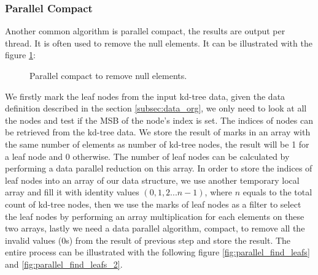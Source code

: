 \subsubsection{Parallel Compact} 
Another common algorithm is parallel compact, the results are output per thread. It is often used to remove the null elements. It can be illustrated with the figure \ref{fig:parallel_compact}: 

\begin{figure}
    \centering
    \renewcommand{\thefigure}{\thechapter.\arabic{figure}}
    \caption[Parallel Compact]{Parallel compact to remove null elements. }
    \label{fig:parallel_compact}
\end{figure} 

We firstly mark the leaf nodes from the input kd-tree data, given the data definition described in the section \ref{subsec:data_org}, we only need to look at all the nodes and test if the MSB of the node's index is set. The indices of nodes can be retrieved from the kd-tree data. We store the result of marks in an array with the same number of elements as number of kd-tree nodes, the result will be 1 for a leaf node and 0 otherwise. The number of leaf nodes can be calculated by performing a data parallel reduction on this array. In order to store the indices of leaf nodes into an array of our data structure, we use another temporary local array and fill it with identity values \( (0, 1, 2 ... n-1) \), where \(n\) equals to the total count of kd-tree nodes, then we use the marks of leaf nodes as a filter to select the leaf nodes by performing an array multiplication for each elements on these two arrays, lastly we need a data parallel algorithm, compact, to remove all the invalid values (0s) from the result of previous step and store the result. The entire process can be illustrated with the following figure \ref{fig:parallel_find_leafs} and \ref{fig:parallel_find_leafs_2}.

